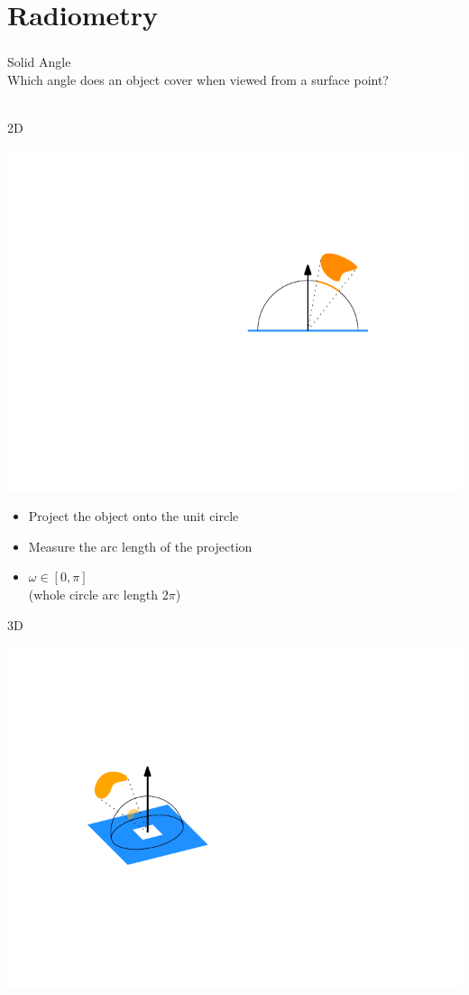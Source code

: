 \documentclass[utf8,stillsansserifmath,fleqn,t]{beamer}
\begin{document}
\section{Radiometry}

\begin{frame}
\frametitle{\insertsection}
Solid Angle\\
Which angle does an object cover when viewed from a surface point?\\
~\\
\begin{minipage}{.48\textwidth}
2D\\[-\baselineskip]
\centerline{\includegraphics[height=.35\textheight]{./fig/solid-angle-2d.pdf}}
\vspace{-\baselineskip}
\begin{itemize}
\item Project the object onto the unit circle
\item Measure the arc length of the projection
\item $\omega \in [0,\pi]$\\
(whole circle arc length $2\pi$)
\end{itemize}
\end{minipage}\hfill
\begin{minipage}{.48\textwidth}
3D\\[-\baselineskip]
\centerline{\includegraphics[height=.35\textheight]{./fig/solid-angle-3d.pdf}}

\end{minipage}
\end{frame}
\end{document}
